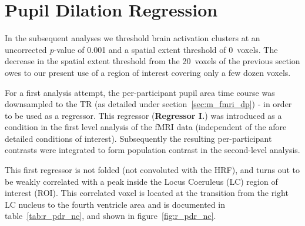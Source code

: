     
    \section{Pupil Dilation Regression}\label{sec:r_pdr}
	In the subsequent analyses we threshold brain activation clusters at an uncorrected \textit{p}-value of 0.001 and a spatial extent threshold of \SI{0}{voxels}.
	The decrease in the spatial extent threshold from the \SI{20}{voxels} of the previous section owes to our present use of a region of interest covering only a few dozen voxels.
    
	For a first analysis attempt, the per-participant pupil area time course was downsampled to the TR (as detailed under section~\ref{sec:m_fmri_dp}) - in order to be used as a regressor.
	This regressor (\textbf{Regressor I.}) was introduced as a condition in the first level analysis of the fMRI data (independent of the afore detailed conditions of interest).
	Subsequently the resulting per-participant contrasts were integrated to form population contrast in the second-level analysis.
	
	This first regressor is not folded (not convoluted with the HRF), and turns out to be weakly correlated with a peak inside the Locus Coeruleus (LC) region of interest (ROI).
	This correlated voxel is located at the transition from the right LC nucleus to the fourth ventricle area and is documented in table~\ref{tab:r_pdr_nc}, and shown in figure~\ref{fig:r_pdr_nc}.
	
